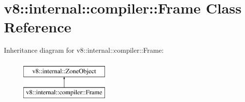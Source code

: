 \hypertarget{classv8_1_1internal_1_1compiler_1_1Frame}{}\section{v8\+:\+:internal\+:\+:compiler\+:\+:Frame Class Reference}
\label{classv8_1_1internal_1_1compiler_1_1Frame}
Inheritance diagram for v8\+:\+:internal\+:\+:compiler\+:\+:Frame\+:\begin{figure}[H]
\begin{center}
\leavevmode
\includegraphics[height=2.000000cm]{classv8_1_1internal_1_1compiler_1_1Frame}
\end{center}
\end{figure}

